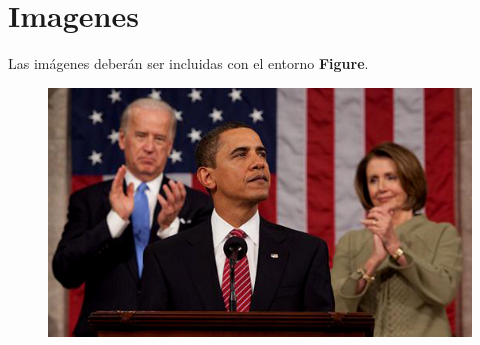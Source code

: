 \documentclass{isnotes}
\begin{document}
\section{Imagenes}
Las imágenes deberán ser incluidas con el entorno \textbf{Figure}.

\begin{figure}[ht!]
\includegraphics[width=\textwidth]{images/obama.png}
\end{figure}
\end{document}
